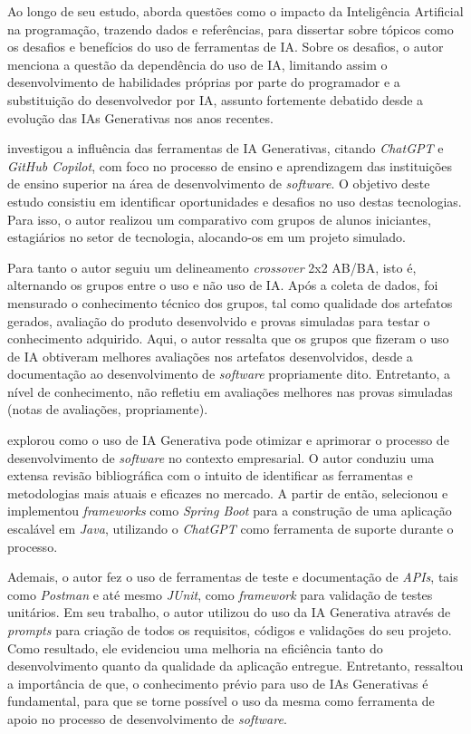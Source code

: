 \documentclass[english,brazilian]{UNISINOSartigo} %
\begin{document}
Ao longo de seu estudo,  aborda questões como o impacto da Inteligência Artificial na programação, trazendo dados e referências, para dissertar sobre tópicos como os desafios e benefícios do uso de ferramentas de IA. Sobre os desafios, o autor menciona a questão da dependência do uso de IA, limitando assim o desenvolvimento de habilidades próprias por parte do programador e a substituição do desenvolvedor por IA, assunto fortemente debatido desde a evolução das IAs Generativas nos anos recentes. 

 investigou a influência das ferramentas de IA Generativas, citando \textit{ChatGPT} e \textit{GitHub Copilot}, com foco no processo de ensino e aprendizagem das instituições de ensino superior na área de desenvolvimento de \textit{software}. O objetivo deste estudo consistiu em identificar oportunidades e desafios no uso destas tecnologias. Para isso, o autor realizou um comparativo com grupos de alunos iniciantes, estagiários no setor de tecnologia, alocando-os em um projeto simulado.

Para tanto o autor \cite{santos2024} seguiu um delineamento \textit{crossover} 2x2 AB/BA, isto é, alternando os grupos entre o uso e não uso de IA. Após a coleta de dados, foi mensurado o conhecimento técnico dos grupos, tal como qualidade dos artefatos gerados, avaliação do produto desenvolvido e provas simuladas para testar o conhecimento adquirido. Aqui, o autor ressalta que os grupos que fizeram o uso de IA obtiveram melhores avaliações nos artefatos desenvolvidos, desde a documentação ao desenvolvimento de \textit{software} propriamente dito. Entretanto, a nível de conhecimento, não refletiu em avaliações melhores nas provas simuladas (notas de avaliações, propriamente).

 explorou como o uso de IA Generativa pode otimizar e aprimorar o processo de desenvolvimento de \textit{software} no contexto empresarial. O autor conduziu uma extensa revisão bibliográfica com o intuito de identificar as ferramentas e metodologias mais atuais e eficazes no mercado. A partir de então, selecionou e implementou \textit{frameworks} como \textit{Spring Boot} para a construção de uma aplicação escalável em \textit{Java}, utilizando o \textit{ChatGPT} como ferramenta de suporte durante o processo.

Ademais, o autor \cite{costa2024} fez o uso de ferramentas de teste e documentação de \textit{APIs}, tais como \textit{Postman} e até mesmo \textit{JUnit}, como \textit{framework} para validação de testes unitários. Em seu trabalho, o autor utilizou do uso da IA Generativa através de \textit{prompts} para criação de todos os requisitos, códigos e validações do seu projeto. Como resultado, ele evidenciou uma melhoria na eficiência tanto do desenvolvimento quanto da qualidade da aplicação entregue. Entretanto, ressaltou a importância de que, o conhecimento prévio para uso de IAs Generativas é fundamental, para que se torne possível o uso da mesma como ferramenta de apoio no processo de desenvolvimento de \textit{software}.
\end{document}
